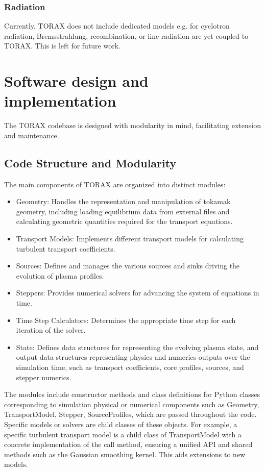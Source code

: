 \documentclass[aps, reprint, nofootinbib]{revtex4-2}
\begin{document}
\subsubsection{Radiation}
Currently, TORAX does not include dedicated models e.g. for cyclotron radiation, Bremsstrahlung, recombination, or line radiation are yet coupled to TORAX. This is left for future work.

\section{Software design and implementation}
\label{sec:software}
The TORAX codebase is designed with modularity in mind, facilitating extension and maintenance. 
\subsection{Code Structure and Modularity}
The main components of TORAX are organized into distinct modules:
\begin{itemize}
    \setlength\itemsep{0.1em}
    \item Geometry: Handles the representation and manipulation of tokamak geometry, including loading equilibrium data from external files and calculating geometric quantities required for the transport equations.
    \item Transport Models: Implements different transport models for calculating turbulent transport coefficients.
    \item Sources: Defines and manages the various sources and sinks driving the evolution of plasma profiles.
    \item Steppers: Provides numerical solvers for advancing the system of equations in time.
    \item Time Step Calculators: Determines the appropriate time step for each iteration of the solver.
    \item State: Defines data structures for representing the evolving plasma state, and output data structures representing physics and numerics outputs over the simulation time, such as transport coefficients, core profiles, sources, and stepper numerics.
\end{itemize}

The modules include constructor methods and class definitions for Python classes corresponding to simulation physical or numerical components such as \textsf{Geometry}, \textsf{TransportModel}, \textsf{Stepper}, \textsf{SourceProfiles}, which are passed throughout the code. Specific models or solvers are child classes of these objects. For example, a specific turbulent transport model is a child class of \textsf{TransportModel} with a concrete implementation of the call method, ensuring a unified API and shared methods such as the Gaussian smoothing kernel. This aids extensions to new models.
\end{document}
